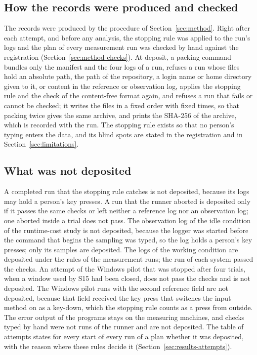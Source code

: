 \subsection{How the records were produced and checked}
\label{sec:dataset-checks}

The records were produced by the procedure of Section~\ref{sec:method}. Right after each attempt, and before any
analysis, the stopping rule was applied to the run's logs and the plan of every measurement run was checked by hand
against the registration (Section~\ref{sec:method-checks}). At deposit, a packing command bundles only the manifest and
the four logs of a run, refuses a run whose files hold an absolute path, the path of the repository, a login name or home
directory given to it, or content in the reference or observation log, applies the stopping rule and the check of the content-free
format again, and refuses a run that fails or cannot be checked; it writes the files in a fixed order with fixed times,
so that packing twice gives the same archive, and prints the SHA-256 of the archive, which is recorded with the run.
The stopping rule exists so that no person's typing enters the data, and its blind spots are stated in the
registration and in Section~\ref{sec:limitations}.

\subsection{What was not deposited}
\label{sec:dataset-excluded}

A completed run that the stopping rule catches is not deposited, because its logs may hold a person's key presses. A
run that the runner aborted is deposited only if it passes the same checks or left neither a reference log nor an
observation log; one aborted inside a trial does not pass. The observation log of the idle condition of the runtime-cost
study is not deposited, because the logger was started before the command that begins the sampling was typed, so the
log holds a person's key presses; only its samples are deposited. The logs of the working condition are deposited under
the rules of the measurement runs; the run of each system passed the checks. An attempt of the Windows pilot that
was stopped after four trials, when a window used by S15 had been closed, does not pass the checks and is not
deposited. The Windows pilot runs with the second reference field are
not deposited, because that field received the key press that switches the input method on as a key-down, which the
stopping rule counts as a press from outside. The error output of the programs stays on the measuring machines, and
checks typed by hand were not runs of the runner and are not deposited. The table of attempts states for every start
of every run of a plan whether it was deposited, with the reason where these rules decide it
(Section~\ref{sec:results-attempts}).

